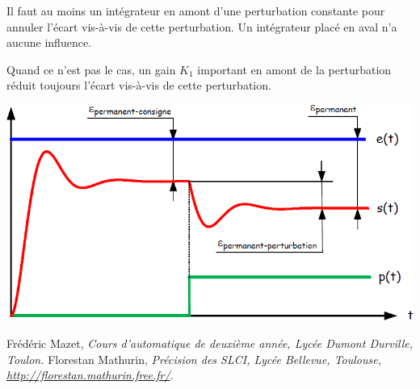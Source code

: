 \documentclass[10pt,fleqn]{article} %
\begin{document}
\begin{resultat}
Il faut au moins un intégrateur en amont d'une perturbation constante pour
annuler l'écart vis-à-vis de cette perturbation. Un intégrateur placé en aval n'a aucune
influence.

Quand ce n'est pas le cas, un gain $K_1$ important en amont de la perturbation réduit toujours
l'écart vis-à-vis de cette perturbation.
\end{resultat}


\begin{center}
\includegraphics[width=.7\linewidth]{images/fig_erreur_02}
\end{center}




\begin{thebibliography}{2}
    Frédéric Mazet, {\it Cours d'automatique de deuxième année, Lycée Dumont Durville, Toulon.}
       Florestan Mathurin, {\it Précision des SLCI, Lycée Bellevue, Toulouse, \url{http://florestan.mathurin.free.fr/}.}



\end{thebibliography}
\end{document}
